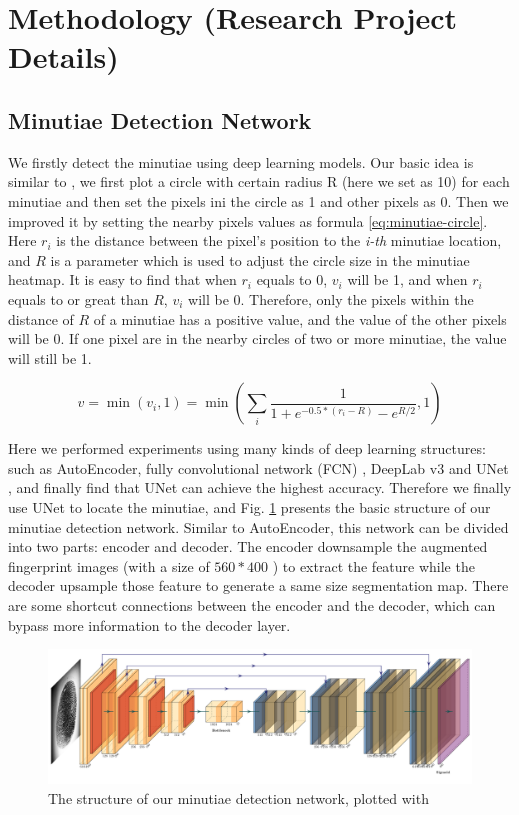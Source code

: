 \section{Methodology (Research Project Details)}
\label{sec:method}

\subsection{Minutiae Detection Network}

We firstly detect the minutiae using deep learning models.
Our basic idea is similar to \cite{AccurateMultiPerson2017}, we first plot a circle with certain radius R (here we set as 10) for each minutiae and then set the pixels ini the circle as 1 and other pixels as 0.
Then we improved it by setting the nearby pixels values as formula \ref{eq:minutiae-circle}.
Here $ r_i $ is the distance between the pixel's position to the \textit{i-th} minutiae location, and $ R $ is a parameter which is used to adjust the circle size in the minutiae heatmap.
It is easy to find that when $ r_i $ equals to $ 0 $, $ v_i $ will be 1, and when $ r_i $ equals to or great than $ R $, $ v_i $ will be 0.
Therefore, only the pixels within the distance of $ R $ of a minutiae has a positive value, and the value of the other pixels will be 0.
If one pixel are in the nearby circles of two or more minutiae, the value will still be 1.


\begin{equation}
    \label{eq:minutiae-circle}
    v = \min(v_i, 1) = \min(\sum_{i}\frac{1}{1 + e^{-0.5*(r_i-R)} - e^{R/2}}, 1)
\end{equation}

Here we performed experiments using many kinds of deep learning structures: such as AutoEncoder, fully convolutional network (FCN) \cite{FCN}, DeepLab v3 \cite{DeepLab-v3} and UNet \cite{unet}, and finally find that UNet can achieve the highest accuracy.
Therefore we finally use UNet to locate the minutiae, and Fig. \ref{fig:unet} presents the basic structure of our minutiae detection network.
Similar to AutoEncoder, this network can be divided into two parts: encoder and decoder.
The encoder downsample the augmented fingerprint images (with a size of $ 560*400 $ ) to extract the feature while the decoder upsample those feature to generate a same size segmentation map.
There are some shortcut connections between the encoder and the decoder, which can bypass more information to the decoder layer.

\begin{figure}[htbp]
    \centering
    \includegraphics[width=.9\linewidth]{fig/unet.pdf}
    \caption{The structure of our minutiae detection network, plotted with \cite{PlotNeuralNet}}
    \label{fig:unet}
\end{figure}


